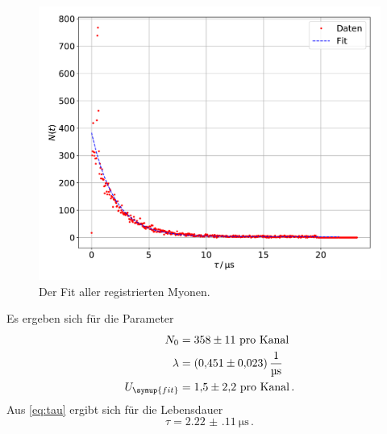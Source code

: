 \documentclass[
  bibliography=totoc,     %
  captions=tableheading,  %
  titlepage=firstiscover, %
]{scrartcl}
\begin{document}
\begin{figure}
  \centering
  \includegraphics[scale=0.5]{fig17.pdf}
  \caption{Der Fit aller registrierten Myonen.}
  \label{fig:16}
\end{figure}
Es ergeben sich für die Parameter
\begin{align}
  N_0 &= \num{358(11)} \ \text{pro Kanal} \\
  \lambda &= \SI{0.451(23)}{\per\micro\second} \label{dauer} \\
  U_{\symup{fit}} &= \num{1.5(22)} \ \text{pro Kanal} \label{Untergrund} \, .
\end{align}
Aus \eqref{eq:tau} ergibt sich für die Lebensdauer
\begin{equation}
  \tau = \SI{2.22(11)}{\micro\second} \, .
\end{equation}
\end{document}
